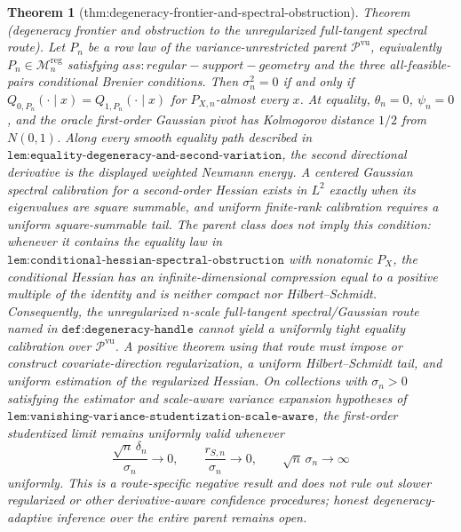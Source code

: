 \documentclass{article}
\newtheorem{theorem}{Theorem}
\begin{document}
\begin{theorem}[thm:degeneracy-frontier-and-spectral-obstruction]\label{thm:degeneracy-frontier-and-spectral-obstruction}
Theorem (degeneracy frontier and obstruction to the unregularized full-tangent spectral route).  Let \(P_n\) be a row law of the variance-unrestricted parent \(\mathscr P^{\mathrm{vu}}\), equivalently \(P_n\in\mathcal M_n^{\mathrm{reg}}\) satisfying \(ass:regular-support-geometry\) and the three all-feasible-pairs conditional Brenier conditions.  Then \(\sigma_n^2=0\) if and only if \(Q_{0,P_n}(\cdot\mid x)=Q_{1,P_n}(\cdot\mid x)\) for \(P_{X,n}\)-almost every \(x\).  At equality, \(\theta_n=0\), \(\psi_n=0\), and the oracle first-order Gaussian pivot has Kolmogorov distance \(1/2\) from \(N(0,1)\).  Along every smooth equality path described in \(\texttt{lem:equality-degeneracy-and-second-variation}\), the second directional derivative is the displayed weighted Neumann energy.  A centered Gaussian spectral calibration for a second-order Hessian exists in \(L^2\) exactly when its eigenvalues are square summable, and uniform finite-rank calibration requires a uniform square-summable tail.  The parent class does not imply this condition: whenever it contains the equality law in \(\texttt{lem:conditional-hessian-spectral-obstruction}\) with nonatomic \(P_X\), the conditional Hessian has an infinite-dimensional compression equal to a positive multiple of the identity and is neither compact nor Hilbert--Schmidt.  Consequently, the unregularized \(n\)-scale full-tangent spectral/Gaussian route named in \(\texttt{def:degeneracy-handle}\) cannot yield a uniformly tight equality calibration over \(\mathscr P^{\mathrm{vu}}\).  A positive theorem using that route must impose or construct covariate-direction regularization, a uniform Hilbert--Schmidt tail, and uniform estimation of the regularized Hessian.  On collections with \(\sigma_n>0\) satisfying the estimator and scale-aware variance expansion hypotheses of \(\texttt{lem:vanishing-variance-studentization-scale-aware}\), the first-order studentized limit remains uniformly valid whenever
\[
\frac{\sqrt n\,\delta_n}{\sigma_n}\to0,\qquad
\frac{r_{S,n}}{\sigma_n}\to0,\qquad
\sqrt n\,\sigma_n\to\infty
\]
uniformly.  This is a route-specific negative result and does not rule out slower regularized or other derivative-aware confidence procedures; honest degeneracy-adaptive inference over the entire parent remains open.
\end{theorem}
\end{document}
